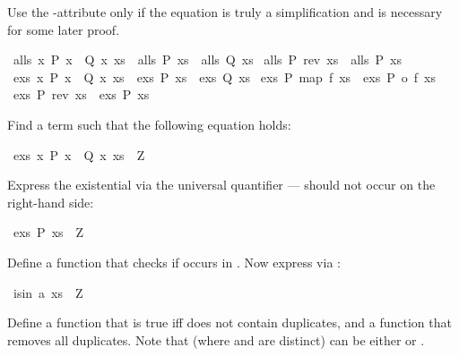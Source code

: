 \begin{isabellebody}
\begin{isamarkuptext}
Use the -attribute only if the equation is truly a
simplification and is necessary for some later proof.%
\end{isamarkuptext}%
\isamarkuptrue%
\ {\isachardoublequote}alls\ {\isacharparenleft}{\isasymlambda}x{\isachardot}\ P\ x\ {\isasymand}\ Q\ x{\isacharparenright}\ xs\ {\isacharequal}\ {\isacharparenleft}alls\ P\ xs\ {\isasymand}\ alls\ Q\ xs{\isacharparenright}{\isachardoublequote}\isamarkupfalse%
\isanewline
\isamarkupfalse%
\ {\isachardoublequote}alls\ P\ {\isacharparenleft}rev\ xs{\isacharparenright}\ {\isacharequal}\ alls\ P\ xs{\isachardoublequote}\isamarkupfalse%
\isanewline
\isamarkupfalse%
\ {\isachardoublequote}exs\ {\isacharparenleft}{\isasymlambda}x{\isachardot}\ P\ x\ {\isasymand}\ Q\ x{\isacharparenright}\ xs\ {\isacharequal}\ {\isacharparenleft}exs\ P\ xs\ {\isasymand}\ exs\ Q\ xs{\isacharparenright}{\isachardoublequote}\isamarkupfalse%
\isanewline
\isamarkupfalse%
\ {\isachardoublequote}exs\ P\ {\isacharparenleft}map\ f\ xs{\isacharparenright}\ {\isacharequal}\ exs\ {\isacharparenleft}P\ o\ f{\isacharparenright}\ xs{\isachardoublequote}\isamarkupfalse%
\isanewline
\isamarkupfalse%
\ {\isachardoublequote}exs\ P\ {\isacharparenleft}rev\ xs{\isacharparenright}\ {\isacharequal}\ exs\ P\ xs{\isachardoublequote}\isamarkupfalse%
\isamarkupfalse%
%
\begin{isamarkuptext}%
Find a term  such that the following equation holds:%
\end{isamarkuptext}%
\isamarkuptrue%
\ {\isachardoublequote}exs\ {\isacharparenleft}{\isasymlambda}x{\isachardot}\ P\ x\ {\isasymor}\ Q\ x{\isacharparenright}\ xs\ {\isacharequal}\ Z{\isachardoublequote}\isamarkupfalse%
\isamarkupfalse%
%
\begin{isamarkuptext}%
Express the existential via the universal quantifier ---
 should not occur on the right-hand side:%
\end{isamarkuptext}%
\isamarkuptrue%
\ {\isachardoublequote}exs\ P\ xs\ {\isacharequal}\ Z{\isachardoublequote}\isamarkupfalse%
\isamarkupfalse%
%
\begin{isamarkuptext}%
Define a function  that checks if  occurs in
. Now express  via :%
\end{isamarkuptext}%
\isamarkuptrue%
\ {\isachardoublequote}is{\isacharunderscore}in\ a\ xs\ {\isacharequal}\ Z{\isachardoublequote}\isamarkupfalse%
\isamarkupfalse%
%
\begin{isamarkuptext}%
Define a function  that is true iff
 does not contain duplicates, and a function  that removes all duplicates. Note that 
(where  and  are distinct) can be either
 or .


\end{isamarkuptext}
\end{isabellebody}
